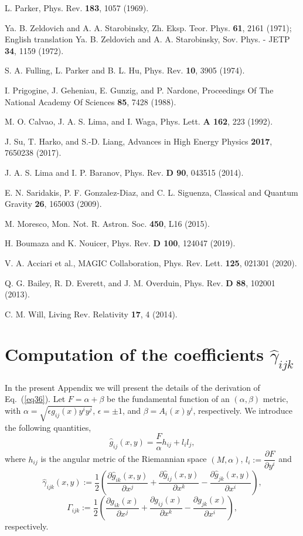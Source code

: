 \documentclass[aps,superscriptaddress, showpacs,preprintnumbers, superscriptaddress, nofootinbibt,twocolumn]{revtex4-2}
\def\be{\begin{equation}}
\def\ee{\end{equation}}
\begin{document}
\begin{thebibliography}{99}
 L. Parker, Phys. Rev. \textbf{183}, 1057 (1969).

 Ya. B. Zeldovich and A. A. Starobinsky, Zh. Eksp. Teor. Phys. {\bf 61}, 2161 (1971); English translation Ya. B. Zeldovich and A. A. Starobinsky, Sov. Phys. - JETP {\bf 34}, 1159 (1972).

 S. A. Fulling, L. Parker and B. L. Hu, Phys. Rev. \textbf{%
10}, 3905 (1974).

 I. Prigogine, J. Geheniau, E. Gunzig, and P. Nardone,
Proceedings Of The National Academy Of Sciences \textbf{85}, 7428 (1988).

 M. O. Calvao, J. A. S. Lima, and I. Waga, Phys. Lett. {\bf  A
162}, 223 (1992).

 J. Su, T. Harko, and S.-D. Liang, Advances in High Energy
Physics \textbf{2017}, 7650238 (2017).

 J. A. S. Lima and I. P. Baranov, Phys. Rev. {\bf D 90},
043515 (2014).

  E. N. Saridakis, P. F. Gonzalez-Diaz, and C. L.
Siguenza, Classical and Quantum Gravity {\bf 26}, 165003
(2009).

 M. Moresco, Mon. Not. R. Astron. Soc. {\bf 450}, L16 (2015).

 H. Boumaza and K. Nouicer, Phys. Rev. {\bf D 100},
124047 (2019).

 V. A. Acciari et al., MAGIC Collaboration, Phys. Rev. Lett. {\bf 125}, 021301 (2020).

 Q. G. Bailey, R. D. Everett, and J. M. Overduin, Phys. Rev. {\bf D 88}, 102001 (2013).

 C. M. Will, 	Living Rev. Relativity {\bf 17},  4 (2014).

\end{thebibliography}

\appendix

\section{Computation of the coefficients $\hat{\gamma}_{ijk}$}\label{appa}

In the present Appendix we will present the details of the derivation of Eq.~(\ref{eq36}). Let $F=\alpha +\beta$ be the fundamental function of an $(\alpha, \beta)$ metric, with $\alpha=\sqrt{\epsilon g_{ij}(x)y^iy^j}$, $\epsilon=\pm 1$, and $\beta =A_i(x)y^i$, respectively. We introduce the following quantities,
\be
\hat{g}_{ij}(x,y)=\frac{F}{\alpha}h_{ij}+l_il_j,
\ee
where $h_{ij}$ is the angular metric of the Riemannian space $(M,\alpha)$, $l_i:=\dfrac{\partial F}{\partial y^i}$ and
\be
\hat{\gamma}_{ijk}(x,y):=\frac{1}{2}\left(\frac{\partial \hat{g}_{ik}(x,y)}{\partial x^j}+\frac{\partial \hat{g}_{ij}(x,y)}{\partial x^k}-\frac{\partial \hat{g}_{jk}(x,y)}{\partial x^i}\right),
\ee
\be
\Gamma _{ijk}:=\frac{1}{2}\left(\frac{\partial g_{ik}(x)}{\partial x^j}+\frac{\partial g_{ij}(x)}{\partial x^k}-\frac{\partial g_{jk}(x)}{\partial x^i}\right),
\ee
respectively.
\end{document}
